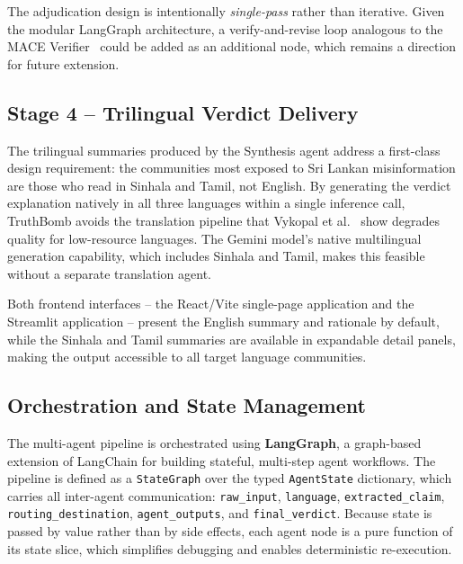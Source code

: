 \documentclass[12pt,a4paper]{article}
\begin{document}
The adjudication design is intentionally \emph{single-pass} rather than
iterative. Given the modular LangGraph architecture, a verify-and-revise
loop analogous to the MACE Verifier~\cite{mace} could be added as an
additional node, which remains a direction for future extension.

\subsection{Stage 4 -- Trilingual Verdict Delivery}
\label{subsec:trilingual}

The trilingual summaries produced by the Synthesis agent address a first-class
design requirement: the communities most exposed to Sri Lankan misinformation
are those who read in Sinhala and Tamil, not English. By generating the
verdict explanation natively in all three languages within a single inference
call, TruthBomb avoids the translation pipeline that Vykopal et
al.~\cite{vykopal} show degrades quality for low-resource languages. The
Gemini model's native multilingual generation capability, which includes
Sinhala and Tamil, makes this feasible without a separate translation agent.

Both frontend interfaces -- the React/Vite single-page application and the
Streamlit application -- present the English summary and rationale by
default, while the Sinhala and Tamil summaries are available in expandable
detail panels, making the output accessible to all target language communities.

\subsection{Orchestration and State Management}
\label{subsec:orchestration}

The multi-agent pipeline is orchestrated using \textbf{LangGraph}, a
graph-based extension of LangChain for building stateful, multi-step agent
workflows. The pipeline is defined as a \texttt{StateGraph} over the typed
\texttt{AgentState} dictionary, which carries all inter-agent communication:
\texttt{raw\_input}, \texttt{language}, \texttt{extracted\_claim},
\texttt{routing\_destination}, \texttt{agent\_outputs}, and
\texttt{final\_verdict}. Because state is passed by value rather than by
side effects, each agent node is a pure function of its state slice, which
simplifies debugging and enables deterministic re-execution.
\end{document}
